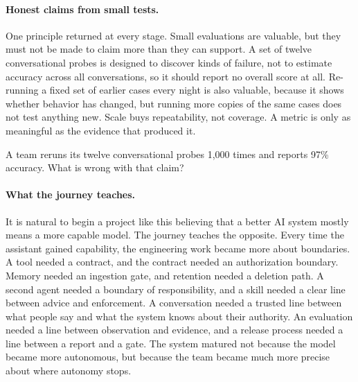 \paragraph{Honest claims from small tests.} One principle returned at every stage. Small evaluations are valuable, but they must not be made to claim more than they can support. A set of twelve conversational probes is designed to discover kinds of failure, not to estimate accuracy across all conversations, so it should report no overall score at all. Re-running a fixed set of earlier cases every night is also valuable, because it shows whether behavior has changed, but running more copies of the same cases does not test anything new. Scale buys repeatability, not coverage. A metric is only as meaningful as the evidence that produced it.

\begin{quickcheck}
A team reruns its twelve conversational probes 1{,}000 times and reports 97\% accuracy. What is wrong with that claim?
\end{quickcheck}

\paragraph{What the journey teaches.} It is natural to begin a project like this believing that a better AI system mostly means a more capable model. The journey teaches the opposite. Every time the assistant gained capability, the engineering work became more about boundaries. A tool needed a contract, and the contract needed an authorization boundary. Memory needed an ingestion gate, and retention needed a deletion path. A second agent needed a boundary of responsibility, and a skill needed a clear line between advice and enforcement. A conversation needed a trusted line between what people say and what the system knows about their authority. An evaluation needed a line between observation and evidence, and a release process needed a line between a report and a gate. The system matured not because the model became more autonomous, but because the team became much more precise about where autonomy stops.

